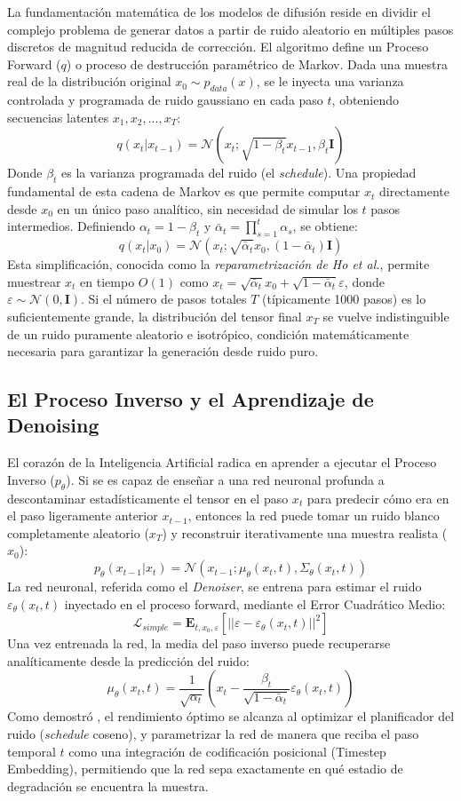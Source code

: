 La fundamentación matemática de los modelos de difusión reside en dividir el complejo problema de generar datos a partir de ruido aleatorio en múltiples pasos discretos de magnitud reducida de corrección. El algoritmo define un Proceso Forward ($q$) o proceso de destrucción paramétrico de Markov. Dada una muestra real de la distribución original $x_0 \sim p_{data}(x)$, se le inyecta una varianza controlada y programada de ruido gaussiano en cada paso $t$, obteniendo secuencias latentes $x_1, x_2, ..., x_T$:
$$ q(x_t | x_{t-1}) = \mathcal{N}(x_t; \sqrt{1 - \beta_t} x_{t-1}, \beta_t \textbf{I}) $$
Donde $\beta_t$ es la varianza programada del ruido (el \textit{schedule}). Una propiedad fundamental de esta cadena de Markov es que permite computar $x_t$ directamente desde $x_0$ en un único paso analítico, sin necesidad de simular los $t$ pasos intermedios. Definiendo $\alpha_t = 1 - \beta_t$ y $\bar{\alpha}_t = \prod_{s=1}^{t} \alpha_s$, se obtiene:
$$ q(x_t | x_0) = \mathcal{N}(x_t; \sqrt{\bar{\alpha}_t} x_0, (1-\bar{\alpha}_t) \textbf{I}) $$
Esta simplificación, conocida como la \textit{reparametrización de Ho et al.}, permite muestrear $x_t$ en tiempo $O(1)$ como $x_t = \sqrt{\bar{\alpha}_t} x_0 + \sqrt{1-\bar{\alpha}_t} \varepsilon$, donde $\varepsilon \sim \mathcal{N}(0, \textbf{I})$. Si el número de pasos totales $T$ (típicamente 1000 pasos) es lo suficientemente grande, la distribución del tensor final $x_T$ se vuelve indistinguible de un ruido puramente aleatorio e isotrópico, condición matemáticamente necesaria para garantizar la generación desde ruido puro.

\subsection{El Proceso Inverso y el Aprendizaje de Denoising}

El corazón de la Inteligencia Artificial radica en aprender a ejecutar el Proceso Inverso ($p_\theta$). Si se es capaz de enseñar a una red neuronal profunda a descontaminar estadísticamente el tensor en el paso $x_t$ para predecir cómo era en el paso ligeramente anterior $x_{t-1}$, entonces la red puede tomar un ruido blanco completamente aleatorio ($x_T$) y reconstruir iterativamente una muestra realista ($x_0$):
$$ p_\theta(x_{t-1} | x_t) = \mathcal{N}(x_{t-1}; \mu_\theta(x_t, t), \Sigma_\theta(x_t, t)) $$
La red neuronal, referida como el \textit{Denoiser}, se entrena para estimar el ruido $\varepsilon_\theta(x_t, t)$ inyectado en el proceso forward, mediante el Error Cuadrático Medio:
$$ \mathcal{L}_{simple} = \mathbf{E}_{t, x_0, \varepsilon} \left[ ||\varepsilon - \varepsilon_\theta(x_t, t)||^2 \right] $$
Una vez entrenada la red, la media del paso inverso puede recuperarse analíticamente desde la predicción del ruido:
$$ \mu_\theta(x_t, t) = \frac{1}{\sqrt{\alpha_t}} \left( x_t - \frac{\beta_t}{\sqrt{1-\bar{\alpha}_t}} \varepsilon_\theta(x_t, t) \right) $$
Como demostró \textcite{nichol2021improved}, el rendimiento óptimo se alcanza al optimizar el planificador del ruido (\textit{schedule} coseno), y parametrizar la red de manera que reciba el paso temporal $t$ como una integración de codificación posicional (Timestep Embedding), permitiendo que la red sepa exactamente en qué estadio de degradación se encuentra la muestra.

